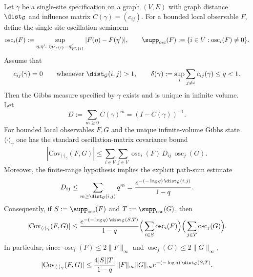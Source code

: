 \begin{proposition}\label{prop:dobrushin_standard}
Let $\gamma$ be a single-site specification on a graph $(V,E)$ with graph distance $\dist_{\mathcal G}$ and influence matrix $C(\gamma)=(c_{ij})$.
For a bounded local observable $F$, define the single-site oscillation seminorm
\[
\operatorname{osc}_i(F):=
\sup_{\eta,\eta':\ \eta_{V\setminus\{i\}}=\eta'_{V\setminus\{i\}}}
|F(\eta)-F(\eta')|,
\qquad
\supp_{\mathrm{osc}}(F):=\{i\in V:\operatorname{osc}_i(F)\neq 0\}.
\]
Assume that
\[
c_{ij}(\gamma)=0\qquad\text{whenever }\dist_{\mathcal G}(i,j)>1,
\qquad
\delta(\gamma):=\sup_i\sum_{j\ne i} c_{ij}(\gamma)\le q<1.
\]
Then the Gibbs measure specified by $\gamma$ exists and is unique in infinite volume.
Let
\[
D:=\sum_{m\ge 0} C(\gamma)^m=(I-C(\gamma))^{-1}.
\]
For bounded local observables $F,G$ and the unique infinite-volume Gibbs state $\langle\cdot\rangle_\gamma$ one has the standard oscillation-matrix covariance bound
\begin{equation}\label{eq:dobrushin_oscillation_bound}
|\mathrm{Cov}_{\langle\cdot\rangle_\gamma}(F,G)|
\le
\sum_{i\in V}\sum_{j\in V}
\operatorname{osc}_i(F)\,D_{ij}\,\operatorname{osc}_j(G).
\end{equation}
Moreover, the finite-range hypothesis implies the explicit path-sum estimate
\begin{equation}\label{eq:dobrushin_D_decay}
D_{ij}
\le
\sum_{m\ge \dist_{\mathcal G}(i,j)} q^m
=
\frac{e^{-(-\log q)\,\dist_{\mathcal G}(i,j)}}{1-q}.
\end{equation}
Consequently, if $S:=\supp_{\mathrm{osc}}(F)$ and $T:=\supp_{\mathrm{osc}}(G)$, then
\begin{equation}\label{eq:dobrushin_support_weighted_bound}
|\mathrm{Cov}_{\langle\cdot\rangle_\gamma}(F,G)|
\le
\frac{e^{-(-\log q)\,\dist_{\mathcal G}(S,T)}}{1-q}
\Big(\sum_{i\in S}\operatorname{osc}_i(F)\Big)
\Big(\sum_{j\in T}\operatorname{osc}_j(G)\Big).
\end{equation}
In particular, since $\operatorname{osc}_i(F)\le 2\|F\|_\infty$ and $\operatorname{osc}_j(G)\le 2\|G\|_\infty$,
\begin{equation}\label{eq:dobrushin_support_cardinality_bound}
|\mathrm{Cov}_{\langle\cdot\rangle_\gamma}(F,G)|
\le
\frac{4|S||T|}{1-q}\,\|F\|_\infty\|G\|_\infty
e^{-(-\log q)\,\dist_{\mathcal G}(S,T)}.
\end{equation}
\end{proposition}

